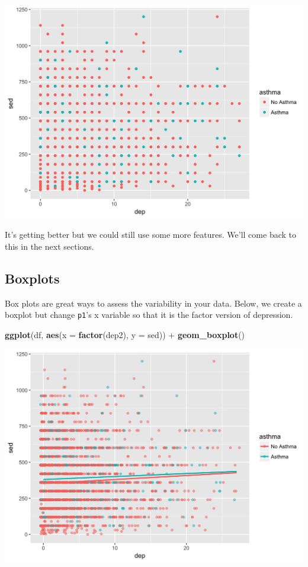 \documentclass[]{tufte-book}
\newenvironment{Shaded}{}{}
\newcommand{\KeywordTok}[1]{\textcolor[rgb]{0.00,0.44,0.13}{\textbf{#1}}}
\newcommand{\DataTypeTok}[1]{\textcolor[rgb]{0.56,0.13,0.00}{#1}}
\newcommand{\StringTok}[1]{\textcolor[rgb]{0.25,0.44,0.63}{#1}}
\newcommand{\OperatorTok}[1]{\textcolor[rgb]{0.40,0.40,0.40}{#1}}
\newcommand{\NormalTok}[1]{#1}
\theoremstyle{definition}
\theoremstyle{definition}
\theoremstyle{remark}
\begin{document}
\includegraphics{_main_files/figure-latex/unnamed-chunk-136-1}

It's getting better but we could still use some more features. We'll
come back to this in the next sections.

\subsection*{Boxplots}\label{boxplots}

Box plots are great ways to assess the variability in your data. Below,
we create a boxplot but change \texttt{p1}'s x variable so that it is
the factor version of depression.

\begin{Shaded}
\begin{Highlighting}[]
\KeywordTok{ggplot}\NormalTok{(df, }\KeywordTok{aes}\NormalTok{(}\DataTypeTok{x =} \KeywordTok{factor}\NormalTok{(dep2), }\DataTypeTok{y =}\NormalTok{ sed)) }\OperatorTok{+}\StringTok{ }\KeywordTok{geom_boxplot}\NormalTok{()}
\end{Highlighting}
\end{Shaded}

\includegraphics{_main_files/figure-latex/unnamed-chunk-137-1}
\end{document}
